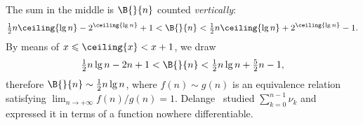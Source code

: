 The sum in the middle is \(\B{}{n}\) counted \emph{vertically}:
\begin{equation*}
\tfrac{1}{2}{n\ceiling{\lg n}} - 2^{\ceiling{\lg n}} + 1 
< \B{}{n} <
\tfrac{1}{2}n\ceiling{\lg n} + 2^{\ceiling{\lg n}} - 1.
\end{equation*}
By means of \(x \leqslant \ceiling{x} < x + 1\), we draw
\begin{equation}
\tfrac{1}{2}{n\lg n} - 2n + 1
< \B{}{n} <
\tfrac{1}{2}n\lg n + \tfrac{5}{2}{n} - 1,
\label{ineq:Btop}
\end{equation}
therefore \(\B{}{n} \sim \tfrac{1}{2}{n\lg n}\), where \(f(n) \sim
g(n)\) is an equivalence relation satisfying \(\lim_{n \rightarrow
  +\infty} f(n)/g(n) = 1\). Delange~\cite{Delange:1975} studied \(\sum_{k=0}^{n-1}\nu_k\) and expressed it in terms of a function nowhere differentiable.
